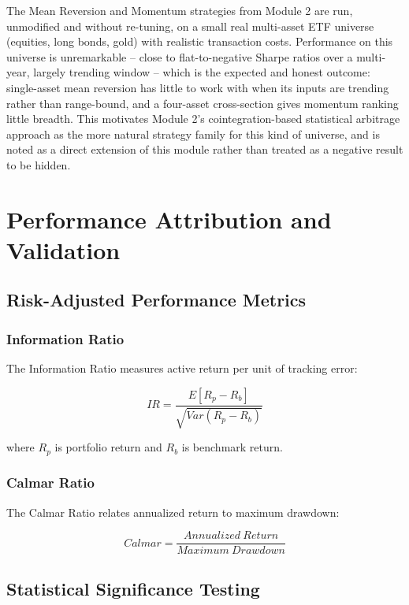 \documentclass[12pt,a4paper]{article}
\begin{document}
The Mean Reversion and Momentum strategies from Module 2 are run, unmodified and without
re-tuning, on a small real multi-asset ETF universe (equities, long bonds, gold) with
realistic transaction costs. Performance on this universe is unremarkable -- close to
flat-to-negative Sharpe ratios over a multi-year, largely trending window -- which is the
expected and honest outcome: single-asset mean reversion has little to work with when its
inputs are trending rather than range-bound, and a four-asset cross-section gives momentum
ranking little breadth. This motivates Module 2's cointegration-based statistical arbitrage
approach as the more natural strategy family for this kind of universe, and is noted as a
direct extension of this module rather than treated as a negative result to be hidden.

\section{Performance Attribution and Validation}

\subsection{Risk-Adjusted Performance Metrics}

\subsubsection{Information Ratio}

The Information Ratio measures active return per unit of tracking error:

\begin{equation}
IR = \frac{E[R_p - R_b]}{\sqrt{Var(R_p - R_b)}}
\end{equation}

where $R_p$ is portfolio return and $R_b$ is benchmark return.

\subsubsection{Calmar Ratio}

The Calmar Ratio relates annualized return to maximum drawdown:

\begin{equation}
Calmar = \frac{Annualized\ Return}{Maximum\ Drawdown}
\end{equation}

\subsection{Statistical Significance Testing}
\end{document}
